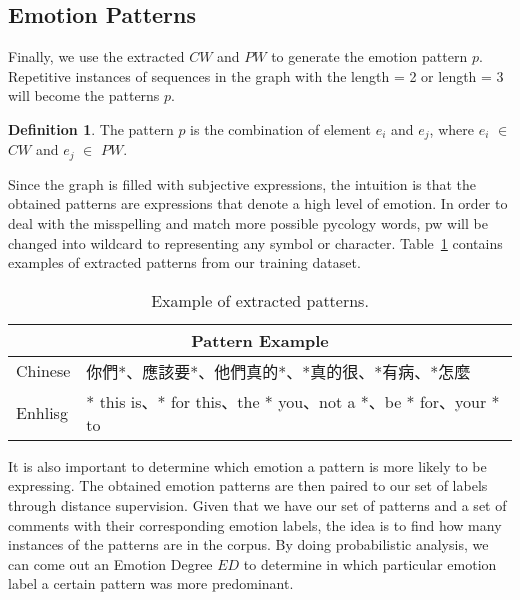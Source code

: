 \documentclass[12pt,a4paper]{report}
\theoremstyle{definition}
\newtheorem{definition}{Definition}[chapter]
\begin{document}
\begin{CJK}{UTF8}{bsmi}
    \subsection{Emotion Patterns}
    \par Finally, we use the extracted \(CW\) and \(PW\) to generate the emotion pattern \(p\). Repetitive instances of sequences in the graph with the length = 2 or length = 3 will become the patterns \(p\).
    \begin{definition}
    The pattern \(p\) is the combination of element \(e_i\) and \(e_j\), where \(e_i\) $\in$ \(CW\) and \(e_j\) $\in$ \(PW\).
    \end{definition}
    \par Since the graph is filled with subjective expressions, the intuition is that the obtained patterns are expressions that denote a high level of emotion. In order to deal with the misspelling and match more possible pycology words, pw will be changed into wildcard to representing any symbol or character. Table~\ref{tab:extracted_pattern} contains examples of extracted patterns from our training dataset.
    \begin{CJK}{UTF8}{bsmi}
    \begin{table}[H]
        \centering
        \begin{tabular}{|p{2cm}|p{11cm}|}
        \hline
        \multicolumn{2}{|c|}{Pattern Example} \\
            \hline
            Chinese & 你們*、應該要*、他們真的*、*真的很、*有病、*怎麼  \\
            \hline
            Enhlisg & * this is、* for this、the * you、not a *、be * for、your * to \\
            \hline
        \end{tabular}
        \caption{Example of extracted patterns.}
        \label{tab:extracted_pattern}
    \end{table}
    \end{CJK}
    \par It is also important to determine which emotion a pattern is more likely to be expressing. The obtained emotion patterns are then paired to our set of labels through distance supervision. Given that we have our set of patterns and a set of comments with their corresponding emotion labels, the idea is to find how many instances of the patterns are in the corpus. By doing probabilistic analysis, we can come out an Emotion Degree \(ED\) to determine in which particular emotion label a certain pattern was more predominant.

\end{CJK}
\end{document}
